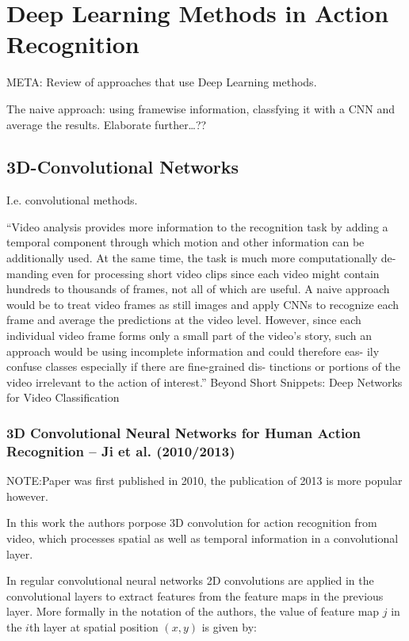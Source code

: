 \section{Deep Learning Methods in Action Recognition}
META: Review of approaches that use Deep Learning methods.

The naive approach: using framewise information, classfying it with a CNN and average the results. Elaborate further\ldots ??

\subsection{3D-Convolutional Networks}
I.e. convolutional methods.

``Video analysis provides more information to the recognition task by adding a temporal component through which motion and other information can be additionally used. At
the same time, the task is much more computationally de-
manding even for processing short video clips since each
video might contain hundreds to thousands of frames, not
all of which are useful. A naive approach would be to treat
video frames as still images and apply CNNs to recognize
each frame and average the predictions at the video level.
However, since each individual video frame forms only a
small part of the video’s story, such an approach would
be using incomplete information and could therefore eas-
ily confuse classes especially if there are fine-grained dis-
tinctions or portions of the video irrelevant to the action of
interest.'' Beyond Short Snippets: Deep Networks for Video Classification

\subsubsection{3D Convolutional Neural Networks for Human Action Recognition -- Ji et al. (2010/2013)}
NOTE:Paper was first published in 2010, the publication of 2013 is more popular however.

In this work \cite{ji_3d_2013} the authors porpose 3D convolution for action recognition from video, which processes spatial as well as temporal information in a convolutional layer.

In regular convolutional neural networks 2D convolutions are applied in the convolutional layers to extract features from the feature maps in the previous layer. More formally in the notation of the authors, the value of feature map $j$ in the $i$th layer at spatial position $(x,y)$ is given by:

